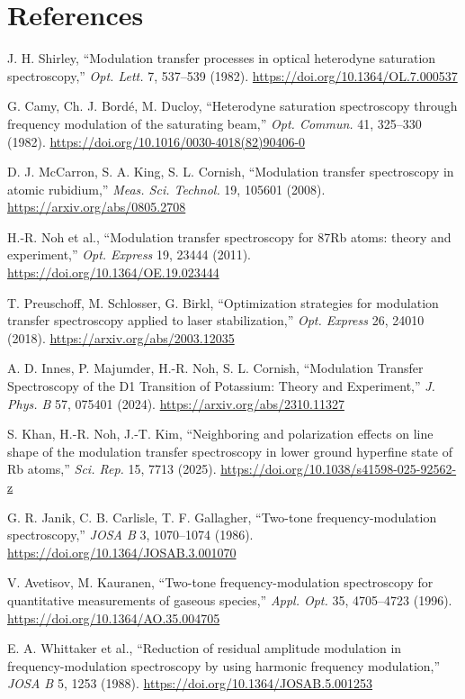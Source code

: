 \documentclass[10pt]{article}
\begin{document}
\section{References}
\small
\begin{enumerate}[label={[\arabic*]},leftmargin=2.0em]
\item J. H. Shirley, ``Modulation transfer processes in optical heterodyne saturation spectroscopy,'' \emph{Opt. Lett.} 7, 537--539 (1982). \url{https://doi.org/10.1364/OL.7.000537}
\item G. Camy, Ch. J. Bord\'e, M. Ducloy, ``Heterodyne saturation spectroscopy through frequency modulation of the saturating beam,'' \emph{Opt. Commun.} 41, 325--330 (1982). \url{https://doi.org/10.1016/0030-4018(82)90406-0}
\item D. J. McCarron, S. A. King, S. L. Cornish, ``Modulation transfer spectroscopy in atomic rubidium,'' \emph{Meas. Sci. Technol.} 19, 105601 (2008). \url{https://arxiv.org/abs/0805.2708}
\item H.-R. Noh et al., ``Modulation transfer spectroscopy for 87Rb atoms: theory and experiment,'' \emph{Opt. Express} 19, 23444 (2011). \url{https://doi.org/10.1364/OE.19.023444}
\item T. Preuschoff, M. Schlosser, G. Birkl, ``Optimization strategies for modulation transfer spectroscopy applied to laser stabilization,'' \emph{Opt. Express} 26, 24010 (2018). \url{https://arxiv.org/abs/2003.12035}
\item A. D. Innes, P. Majumder, H.-R. Noh, S. L. Cornish, ``Modulation Transfer Spectroscopy of the D1 Transition of Potassium: Theory and Experiment,'' \emph{J. Phys. B} 57, 075401 (2024). \url{https://arxiv.org/abs/2310.11327}
\item S. Khan, H.-R. Noh, J.-T. Kim, ``Neighboring and polarization effects on line shape of the modulation transfer spectroscopy in lower ground hyperfine state of Rb atoms,'' \emph{Sci. Rep.} 15, 7713 (2025). \url{https://doi.org/10.1038/s41598-025-92562-z}
\item G. R. Janik, C. B. Carlisle, T. F. Gallagher, ``Two-tone frequency-modulation spectroscopy,'' \emph{JOSA B} 3, 1070--1074 (1986). \url{https://doi.org/10.1364/JOSAB.3.001070}
\item V. Avetisov, M. Kauranen, ``Two-tone frequency-modulation spectroscopy for quantitative measurements of gaseous species,'' \emph{Appl. Opt.} 35, 4705--4723 (1996). \url{https://doi.org/10.1364/AO.35.004705}
\item E. A. Whittaker et al., ``Reduction of residual amplitude modulation in frequency-modulation spectroscopy by using harmonic frequency modulation,'' \emph{JOSA B} 5, 1253 (1988). \url{https://doi.org/10.1364/JOSAB.5.001253}

\end{enumerate}
\end{document}
